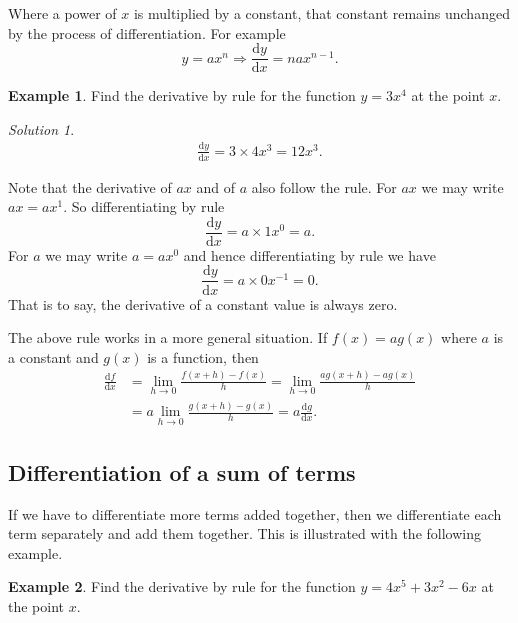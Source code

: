 \documentclass[
  english,
  11pt,
  oneside]{book}
\newcommand{\slide}{}
\theoremstyle{definition}
\theoremstyle{definition}
\newtheorem{example}{Example}[chapter]
\theoremstyle{definition}
\theoremstyle{definition}
\theoremstyle{remark}
\newtheorem*{solution}{Solution}
\begin{document}
Where a power of \(x\) is multiplied by a constant, that constant remains unchanged by the process of differentiation. For example
\[
y = ax^n \Rightarrow \frac{\mathrm{d} y}{\mathrm{d} x} = nax^{n-1}.
\]

\begin{example}
Find the derivative by rule for the function \(y = 3x^4\) at the point \(x\).
\end{example}

\begin{solution}
\begin{gather*}
\frac{\mathrm{d} y}{\mathrm{d} x} = 3\times4x^3 = 12 x^3.
\end{gather*}
\end{solution}

\slide

Note that the derivative of \(ax\) and of \(a\) also follow the rule. For \(ax\) we may write \(ax = ax^1\). So differentiating by rule
\[
\frac{\mathrm{d} y}{\mathrm{d} x} = a\times1x^0 = a.
\]
For \(a\) we may write \(a = ax^0\) and hence differentiating by rule we have
\[
\frac{\mathrm{d} y}{\mathrm{d} x} = a\times0x^{-1} = 0.
\]
That is to say, the derivative of a constant value is always zero.

\slide

The above rule works in a more general situation. If \(f(x) = ag(x)\) where \(a\) is a constant and \(g(x)\) is a function, then
\begin{align*}
\frac{\mathrm{d} f}{\mathrm{d} x} &= \lim\limits_{h\to0}\frac{f(x+h)-f(x)}{h} = \lim\limits_{h\to0}\frac{ag(x+h)-ag(x)}{h} \\ &= a\lim\limits_{h\to0}\frac{g(x+h)-g(x)}{h} = a\frac{\mathrm{d} g}{\mathrm{d} x}.
\end{align*}

\slide

\subsection{Differentiation of a sum of terms}\label{differentiation-of-a-sum-of-terms}

If we have to differentiate more terms added together, then we differentiate each term separately and add them together. This is illustrated with the following example.

\begin{example}
Find the derivative by rule for the function \(y = 4x^5+3x^2-6x\) at the point \(x\).
\end{example}
\end{document}
